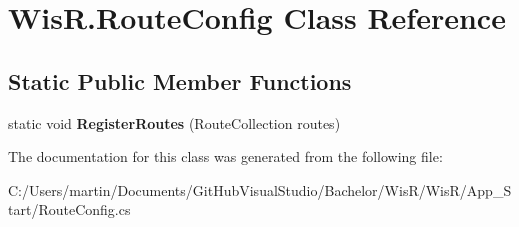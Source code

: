 \hypertarget{class_wis_r_1_1_route_config}{}\section{Wis\+R.\+Route\+Config Class Reference}
\label{class_wis_r_1_1_route_config}
\subsection*{Static Public Member Functions}
\begin{DoxyCompactItemize}
\item 
\hypertarget{class_wis_r_1_1_route_config_a71d8db8b2e6b0fc8c63c999de33a91cb}{}static void {\bfseries Register\+Routes} (Route\+Collection routes)\label{class_wis_r_1_1_route_config_a71d8db8b2e6b0fc8c63c999de33a91cb}

\end{DoxyCompactItemize}


The documentation for this class was generated from the following file\+:\begin{DoxyCompactItemize}
\item 
C\+:/\+Users/martin/\+Documents/\+Git\+Hub\+Visual\+Studio/\+Bachelor/\+Wis\+R/\+Wis\+R/\+App\+\_\+\+Start/Route\+Config.\+cs\end{DoxyCompactItemize}

